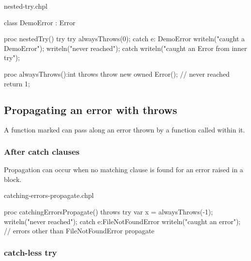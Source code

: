 \begin{chapelexample}{nested-try.chpl}
\begin{chapel}
class DemoError : Error { }

proc nestedTry() {
  try {
    try {
      alwaysThrows(0);
    } catch e: DemoError {
      writeln("caught a DemoError");
    }
    writeln("never reached");
  } catch {
    writeln("caught an Error from inner try");
  }
}
\end{chapel}
\begin{chapelpost}
proc alwaysThrows():int throws {
  throw new owned Error();
  // never reached
  return 1;
}
\end{chapelpost}
\begin{chapeloutput}
\end{chapeloutput}
\end{chapelexample}

\subsection{Propagating an error with throws}
\label{Propagating_an_error_with_throws}

A function marked  can pass along an error thrown by a
function called within it.

\subsubsection{After catch clauses}
\label{After_catch_clauses}

Propagation can occur when no matching  clause is found for an
error raised in a  block.

\begin{chapelexample}{catching-errors-propagate.chpl}
\begin{chapel}
proc catchingErrorsPropagate() throws {
  try {
    var x = alwaysThrows(-1);
    writeln("never reached");
  } catch e:FileNotFoundError {
    writeln("caught an error");
  }
  // errors other than FileNotFoundError propagate
}
\end{chapel}
\begin{chapelpost}
\end{chapelpost}
\begin{chapeloutput}
\end{chapeloutput}
\end{chapelexample}

\subsubsection{catch-less try}
\label{catch_less_try}

